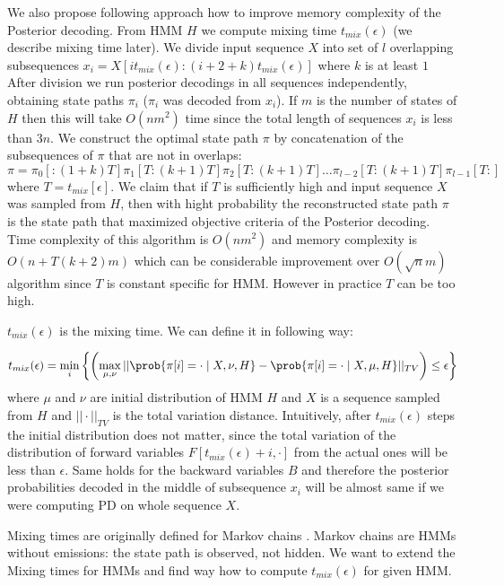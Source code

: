 We also propose following approach how to improve memory complexity of the
Posterior decoding. From HMM $H$ we compute mixing time
$t_{mix}(\epsilon)$ (we describe mixing time later).  We divide input sequence
$X$ into set of $l$ overlapping subsequences
$x_i=X[it_{mix}(\epsilon):(i+2+k)t_{mix}(\epsilon)]$ where $k$ is at least $1$
After division we run posterior decodings in all sequences
independently, obtaining state paths $\pi_i$ ($\pi_i$ was decoded from $x_i$). If $m$ is the number of states of $H$ then this will
take $O(nm^2)$ time since the total length of sequences $x_i$ is less than $3n$.
We construct the optimal state path $\pi$ by concatenation of the subsequences
of $\pi$ that are not in overlaps:
\[\pi = \pi_0[:(1+k)T] \pi_1[T:(k+1)T] \pi_2[T:(k+1)T] \dots
\pi_{l-2}[T:(k+1)T] \pi_{l-1}[T:]\] where $T=t_{mix}[\epsilon]$. We claim that
if $T$ is sufficiently high and input sequence $X$ was sampled from $H$, then
with hight probability the reconstructed state path $\pi$ is the state path that
maximized objective criteria of the Posterior decoding.
Time complexity of this algorithm is $O(nm^2)$ and memory complexity is
$O(n+T(k+2)m)$ which can be considerable improvement over $O(\sqrt n m)$
algorithm since $T$ is constant specific for HMM. However in practice $T$ can be
too high.

\def\tmix{t_{mix}(\epsilon)}

$\tmix$ is the mixing time. We can define it in following way:

\[\tmix = \min_{i}\left\{ 
\left(\max_{\mu,\nu} || \prob{\pi[i] = \cdot\mid X,\nu,H} - \prob{\pi[i] = \cdot\mid
X,\mu,H}||_{TV}\right)\leq \epsilon
\right\}
\] 
where $\mu$ and $\nu$ are initial distribution of HMM $H$ and $X$ is a sequence
sampled from $H$ and $||\cdot||_{TV}$ is the total variation distance.
Intuitively, after $\tmix$ steps the initial distribution does not matter, since
the total variation of the distribution of forward variables $F[\tmix+i,\cdot]$
from the actual ones will be less than $\epsilon$. Same holds for the backward
variables $B$ and therefore the posterior probabilities decoded in the middle of
subsequence $x_i$ will be almost same if we were computing PD on whole sequence
$X$.

Mixing times are originally defined for Markov chains \cite{Levin2006}. Markov
chains are HMMs without emissions: the state path is observed, not hidden. We
want to extend the Mixing times for HMMs and find way how to compute $\tmix$ for
given HMM.


